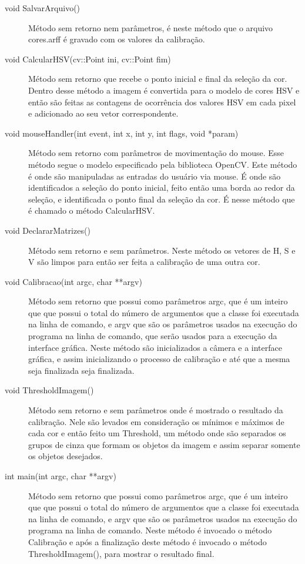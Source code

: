 	
	\begin{description}
	\item [void SalvarArquivo()]
		Método sem retorno nem parâmetros, é neste método que o arquivo cores.arff é gravado com os valores da calibração.
	\item [void CalcularHSV(cv::Point ini, cv::Point fim)]
	Método sem retorno que recebe o ponto inicial e final da seleção da cor. Dentro desse método a imagem é convertida para o modelo de cores HSV e então são feitas as contagens de ocorrência dos valores HSV em cada pixel e adicionado ao seu vetor correspondente.
	\item [void mouseHandler(int event, int x, int y, int flags, void *param)]
	Método sem retorno com parâmetros de movimentação do mouse. Esse método segue o modelo especificado pela biblioteca OpenCV. Este método é onde são manipuladas as entradas do usuário via mouse. É onde são identificados a seleção do ponto inicial, feito então uma borda ao redor da seleção, e identificada o ponto final da seleção da cor. É nesse método que é chamado o método CalcularHSV.
	\item  [void DeclararMatrizes()]
	Método sem retorno e sem parâmetros. Neste método os vetores de H, S e V são limpos para então ser feita a calibração de uma outra cor.
	\item [void Calibracao(int argc, char **argv)]
	Método sem retorno que possui como parâmetros argc, que é um inteiro que que possui o total do número de argumentos que a classe foi executada na linha de comando, e argv que são os parâmetros usados na execução do programa na linha de comando, que serão usados para a execução da interface gráfica. Neste método são inicializados a câmera e a interface gráfica, e assim inicializando o processo de calibração e até que a mesma seja finalizada seja finalizada. 
	\item [void ThresholdImagem()]
	Método sem retorno e sem parâmetros onde é mostrado o resultado da calibração. Nele são levados em consideração os mínimos e máximos de cada cor e então feito um Threshold, um método onde são separados os grupos de cinza que formam os objetos da imagem e assim separar somente os objetos desejados.
	\item [int main(int argc, char **argv)]
	Método sem retorno que possui como parâmetros argc, que é um inteiro que que possui o total do número de argumentos que a classe foi executada na linha de comando, e argv que são os parâmetros usados na execução do programa na linha de comando. Neste método é invocado o método Calibração e após a finalização deste método é invocado o método ThresholdImagem(), para mostrar o resultado final.
	\end{description}
